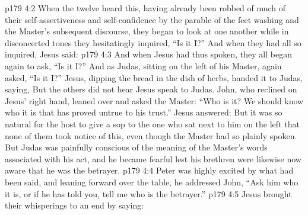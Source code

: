 \vs p179 4:2 When the twelve heard this, having already been robbed of much of their self\hyp{}assertiveness and self\hyp{}confidence by the parable of the feet washing and the Master’s subsequent discourse, they began to look at one another while in disconcerted tones they hesitatingly inquired, “Is it I?” And when they had all so inquired, Jesus said: 
\vs p179 4:3 And when Jesus had thus spoken, they all began again to ask, “Is it I?” And as Judas, sitting on the left of his Master, again asked, “Is it I?” Jesus, dipping the bread in the dish of herbs, handed it to Judas, saying,  But the others did not hear Jesus speak to Judas. John, who reclined on Jesus’ right hand, leaned over and asked the Master: “Who is it? We should know who it is that has proved untrue to his trust.” Jesus answered:  But it was so natural for the host to give a sop to the one who sat next to him on the left that none of them took notice of this, even though the Master had so plainly spoken. But Judas was painfully conscious of the meaning of the Master’s words associated with his act, and he became fearful lest his brethren were likewise now aware that he was the betrayer.
\vs p179 4:4 Peter was highly excited by what had been said, and leaning forward over the table, he addressed John, “Ask him who it is, or if he has told you, tell me who is the betrayer.”
\vs p179 4:5 Jesus brought their whisperings to an end by saying: 
